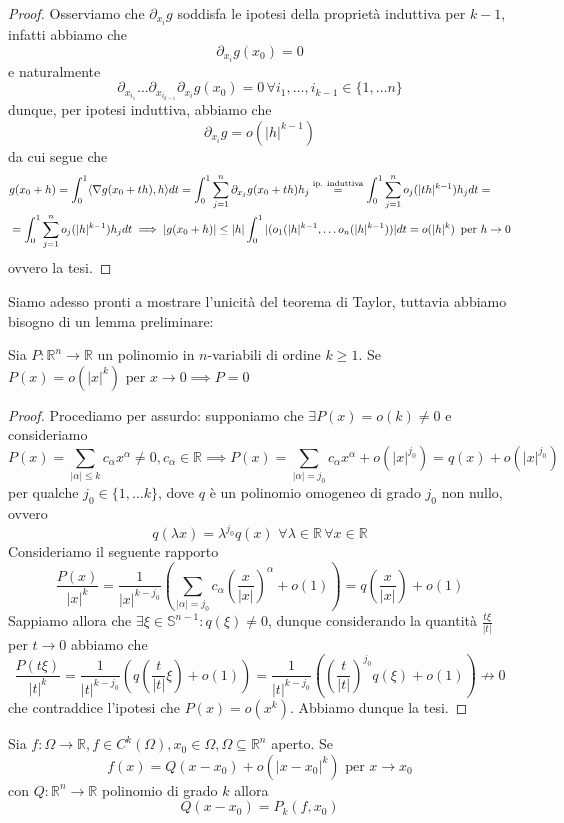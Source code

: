 \documentclass[openany, italian]{book}
\begin{document}
\begin{proof}
Osserviamo che $\partial_{x_i} g$ soddisfa le ipotesi della proprietà induttiva per $k-1$, infatti abbiamo che
$$
\partial_{x_i} g(x_0) = 0
$$
e naturalmente
$$
\partial_{x_{i_1}} \ldots \partial_{x_{i_{k-1}}} \partial_{x_i} g(x_0) = 0 \, \forall i_1, \ldots, i_{k-1} \in \{1, \ldots n\}
$$
dunque, per ipotesi induttiva, abbiamo che
$$
\partial_{x_i} g = o(|h|^{k-1})
$$
da cui segue che
\begin{align*}
&g(x_0 + h) = \int_0^1 \langle \nabla g(x_0 + th), h \rangle dt = \int_0^1 \sum_{j=1}^n \partial_{x_j} g(x_0 + th)h_j \stackrel{\text{ip. induttiva}}{=} \int_0^1 \sum_{j=1}^n o_j(|th|^{k-1})h_j dt = \\ &= \int_0^1 \sum_{j=1}^n o_j(|h|^{k-1})h_j dt \implies |g(x_0+h)| \leq |h| \int_0^1 |(o_1(|h|^{k-1}, \ldots o_n(|h|^{k-1}))|dt = o(|h|^k) \, \text{ per } h \to 0
\end{align*}
ovvero la tesi.
\end{proof}
Siamo adesso pronti a mostrare l'unicità del teorema di Taylor, tuttavia abbiamo bisogno di un lemma preliminare:
\begin{lemma}
Sia $P:\mathbb{R}^n \to \mathbb{R}$ un polinomio in $n$-variabili di ordine $k \geq 1$. Se $P(x) = o(|x|^k) \text{ per } x \to 0 \implies P = 0$
\end{lemma}
\begin{proof} Procediamo per assurdo: supponiamo che $\exists P(x) = o(k) \neq 0$ e consideriamo
$$
P(x) = \sum_{|\alpha| \leq k} c_{\alpha}x^{\alpha} \neq 0, c_{\alpha} \in \mathbb{R} \implies P(x) = \sum_{|\alpha| = j_0} c_{\alpha} x^{\alpha} + o(|x|^{j_0}) = q(x) + o(|x|^{j_0})
$$
per qualche $j_0 \in \{1, \ldots k \}$, dove $q$ è un polinomio omogeneo di grado $j_0$ non nullo, ovvero 
$$
q(\lambda x) = \lambda^{j_0} q(x) \, \, \forall \lambda \in \mathbb{R} \, \forall x \in \mathbb{R}
$$
Consideriamo il seguente rapporto
$$
\frac{P(x)}{|x|^k} = \frac{1}{|x|^{k-j_0}} \left(\sum_{|\alpha|=j_0} c_{\alpha} \left( \frac{x}{|x|} \right)^{\alpha} + o(1) \right) = q \left( \frac{x}{|x|} \right)+o(1)
$$
Sappiamo allora che $\exists \xi \in \mathbb{S}^{n-1}: q(\xi) \neq 0$, dunque considerando la quantità $\frac{t\xi}{|t|}$ per $t \to 0$ abbiamo che
$$
\frac{P(t\xi)}{|t|^k} = \frac{1}{|t|^{k-j_0}} \left(q \left( \frac{t}{|t|}\xi \right) + o(1) \right) = \frac{1}{|t|^{k-j_0}} \left( \left( \frac{t}{|t|} \right)^{j_0} q(\xi) + o(1) \right) \not\to 0
$$
che contraddice l'ipotesi che $P(x) = o(x^k)$. Abbiamo dunque la tesi.
\end{proof}
\begin{theorem}
Sia $f: \Omega \to \mathbb{R}, f \in C^k(\Omega), x_0 \in \Omega, \Omega \subseteq \mathbb{R}^n$ aperto. Se
$$
f(x) = Q(x-x_0) + o(|x-x_0|^k) \text{ per } x \to x_0
$$
con $Q: \mathbb{R}^n \to \mathbb{R}$ polinomio di grado $k$ allora
$$
Q(x - x_0) = P_k(f, x_0)
$$
\end{theorem}
\end{document}
